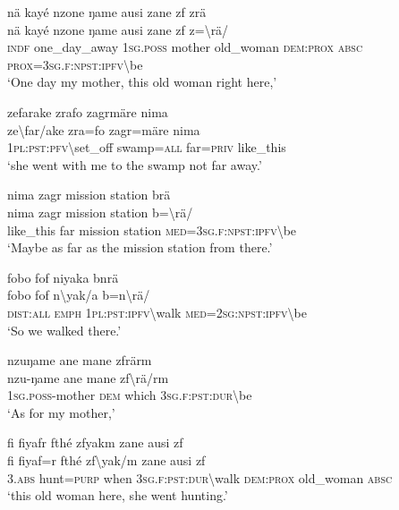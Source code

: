 \newpage
\ea\label{ex:14:a2929}
nä kayé nzone ŋame ausi zane zf zrä\\
\gll nä	kayé	nzone	ŋame	ausi	zane	zf	z={\textbackslash}rä/\\
     \textsc{indf}	one\_day\_away	1\textsc{sg}.\textsc{poss}	mother	old\_woman	\textsc{dem}:\textsc{prox}	\textsc{absc}	\textsc{prox}=3\textsc{sg}.\textsc{f}:\textsc{npst}:\textsc{ipfv}{\textbackslash}be\\
\glt `One day my mother, this old woman right here,'
\z

\ea\label{ex:14:a2932}
zefarake zrafo zagrmäre nima\\
\gll ze{\textbackslash}far/ake	zra=fo	zagr=märe	nima\\
     1\textsc{pl}:\textsc{pst}:\textsc{pfv}{\textbackslash}set\_off	swamp=\textsc{all}	far=\textsc{priv}	like\_this\\
\glt `she went with me to the swamp not far away.'
\z

\ea\label{ex:14:a2934}
nima zagr mission station brä\\
\gll nima	zagr	mission	station	b={\textbackslash}rä/\\
     like\_this	far	mission	station	\textsc{med}=3\textsc{sg}.\textsc{f}:\textsc{npst}:\textsc{ipfv}{\textbackslash}be\\
\glt `Maybe as far as the mission station from there.'
\z

\ea\label{ex:14:a2937}
fobo fof niyaka bnrä\\
\gll fobo	fof	n{\textbackslash}yak/a	b=n{\textbackslash}rä/\\
     \textsc{dist}:\textsc{all}	\textsc{emph}	1\textsc{pl}:\textsc{pst}:\textsc{ipfv}{\textbackslash}walk	\textsc{med}=2\textsc{sg}:\textsc{npst}:\textsc{ipfv}{\textbackslash}be\\
\glt `So we walked there.'
\z

\ea\label{ex:14:a2939}
nzuŋame ane mane zfrärm\\
\gll nzu-ŋame	ane	mane	zf{\textbackslash}rä/rm\\
     1\textsc{sg}.\textsc{poss}-mother	\textsc{dem}	which	3\textsc{sg}.\textsc{f}:\textsc{pst}:\textsc{dur}{\textbackslash}be\\
\glt `As for my mother,'
\z

\ea\label{ex:14:a2940}
fi fiyafr fthé zfyakm zane ausi zf\\
\gll fi	fiyaf=r	fthé	zf{\textbackslash}yak/m	zane	ausi	zf\\
     3.\textsc{abs}	hunt=\textsc{purp}	when	3\textsc{sg}.\textsc{f}:\textsc{pst}:\textsc{dur}{\textbackslash}walk	\textsc{dem}:\textsc{prox}	old\_woman	\textsc{absc}\\
\glt `this old woman here, she went hunting.'
\z


